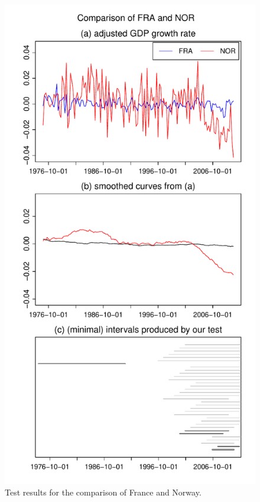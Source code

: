 \documentclass[a4paper,12pt]{article}
\begin{document}
\begin{figure}[t!]
\begin{minipage}[t]{0.49\textwidth}
\includegraphics[width=\textwidth]{output/plots/gdp/FRA_vs_NOR}
\caption{Test results for the comparison of France and Norway.}\label{fig:France:Norway}
\end{minipage}
\hspace{0.25cm}

\end{figure}
\end{document}
